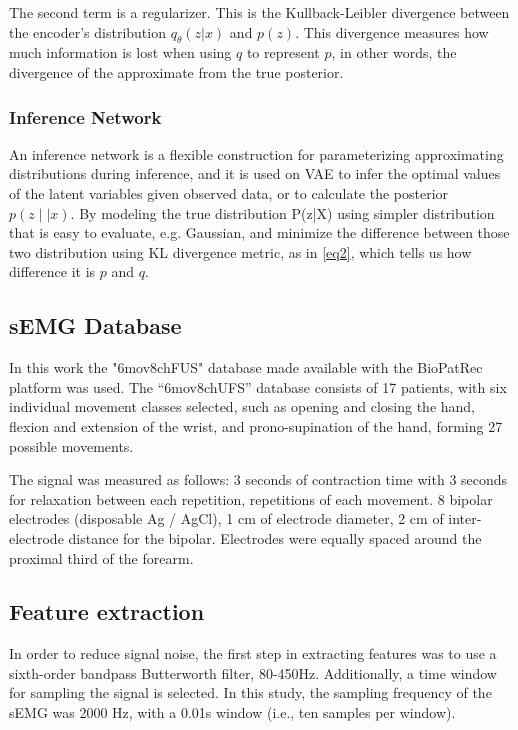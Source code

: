 \documentclass[nouppercase]{ifmbe}
\begin{document}
The second term is a regularizer. This is the Kullback-Leibler divergence between the encoder’s distribution $q_\theta(z|x)$ and $p(z)$. This divergence measures how much information is lost when using $q$ to
represent $p$, in other words, the divergence of the approximate from the true posterior.

\subsubsection{Inference Network}

An inference network is a flexible construction for parameterizing approximating distributions during inference\cite{Dayan1999}, and it is used on VAE\cite{Rezende2014, Welling} to infer the optimal values of the latent variables given observed data, or to calculate the posterior $p(z∣|x)$. By modeling the true
distribution P(z|X) using simpler distribution that is easy to evaluate, e.g. Gaussian, and minimize the
difference between those two distribution using KL divergence metric, as in \ref{eq2}, which tells us how difference it is $p$ and $q$.

\subsection{sEMG Database}

In this work the "6mov8chFUS" database made available with the BioPatRec platform\cite{Ortiz-Catalan2013} was used. The “6mov8chUFS” database consists of 17 patients, with six individual movement classes selected, such as opening and closing the hand, flexion and extension of the wrist, and prono-supination of the hand, forming 27 possible movements.

The signal was measured as follows: 3 seconds of contraction time with 3 seconds for relaxation between each repetition, repetitions of each movement. 8 bipolar electrodes (disposable Ag / AgCl), 1 cm of electrode diameter, 2 cm of inter-electrode distance for the bipolar. Electrodes were equally spaced around the proximal third of the forearm.

\subsection{Feature extraction}

In order to reduce signal noise, the first step in extracting features was to use a sixth-order bandpass Butterworth filter, 80-450Hz. Additionally, a time window for sampling the signal is selected. In this study, the sampling frequency of the sEMG was 2000 Hz, with a 0.01s window (i.e., ten samples per window).
\end{document}
